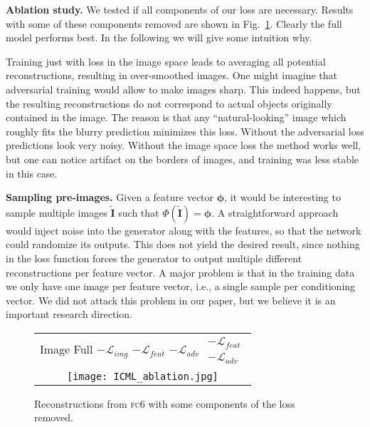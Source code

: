 \documentclass{article}
\newcommand{\fc}{\textsc{fc}}
\newcommand{\img}{\mathbf{I}}
\newcommand{\feat}{\mathbf{\phi}}
\newcommand{\recimg}{\widetilde{\img}}
\newcommand{\repres}{\Phi}
\newcommand{\loss}{\mathcal{L}}
\newcommand{\featloss}{\loss_{feat}}
\newcommand{\discrloss}{\loss_{adv}}
\newcommand{\pixloss}{\loss_{img}}
\begin{document}
\textbf{Ablation study.}
We tested if all components of our loss are necessary.
Results with some of these components removed are shown in Fig.~\ref{fig:ablation}.
Clearly the full model performs best. In the following we will give some intuition why.

Training just with loss in the image space leads to averaging all potential reconstructions, resulting in over-smoothed images.
One might imagine that adversarial training would allow to make images sharp.
This indeed happens, but the resulting reconstructions do not correspond to actual objects originally contained in the image.
The reason is that any ``natural-looking'' image which roughly fits the blurry prediction minimizes this loss.
Without the adversarial loss predictions look very noisy.
Without the image space loss the method works well, but one can notice artifact on the borders of images, and training was less stable in this case.

\textbf{Sampling pre-images.}
Given a feature vector $\feat$, it would be interesting to sample multiple images $\recimg$ such that $\repres(\recimg) = \feat$.
A straightforward approach would inject noise into the generator along with the features, so that the network could randomize its outputs.
This does not yield the desired result, since nothing in the loss function forces the generator to output multiple different reconstructions per feature vector.
A major problem is that in the training data we only have one image per feature vector, i.e., a single sample per conditioning vector.
We did not attack this problem in our paper, but we believe it is an important research direction.

\begin{figure}
\begin{center}
\setlength{\tabcolsep}{0.1cm}
\renewcommand{\arraystretch}{1}
\small{
  \begin{tabular}{c}
  \;\;Image \quad\;\; Full \quad\; $-\pixloss$ \;\;\; $-\featloss$ \; $-\discrloss$  $\begin{array} {lcl} -\featloss \\ -\discrloss \end{array}$  \\
  \texttt{[image: ICML\_ablation.jpg]}\\
   \end{tabular}}
\end{center}
   \caption{Reconstructions from \fc6 with some components of the loss removed.}
\label{fig:ablation}
\end{figure}
\end{document}
